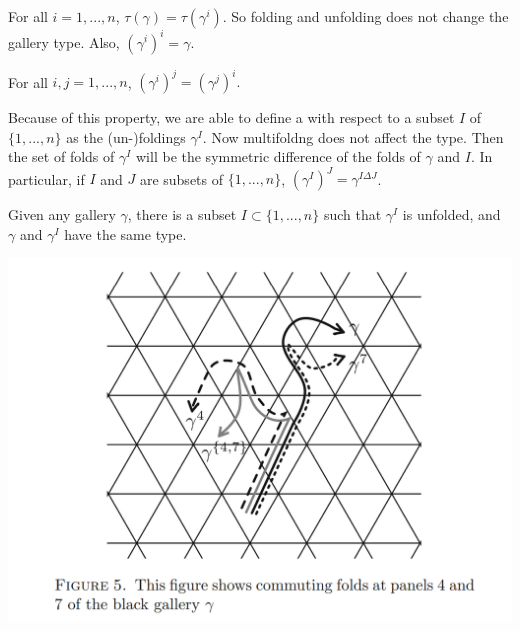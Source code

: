 \documentclass[12pt]{article}
\begin{document}
\begin{lemma}
    For all $i=1,...,n$, $\tau(\gamma)=\tau(\gamma^i)$. So folding and unfolding does not change the gallery type. Also, $(\gamma^i)^i=\gamma$.
\end{lemma}

\begin{lemma}
    For all $i,j=1,...,n$, $(\gamma^i)^j=(\gamma^j)^i.$
\end{lemma}

Because of this property, we are able to define a  with respect to a subset $I$ of $\{1,...,n\}$ as the (un-)foldings $\gamma^I$. Now multifoldng does not affect the type. Then the set of folds of $\gamma^I$ will be the symmetric difference of the folds of $\gamma$ and $I$. In particular, if $I$ and $J$ are subsets of $\{1,...,n\}$, $(\gamma^I)^J=\gamma^{I\Delta J}$. 

\begin{corollary}
    Given any gallery $\gamma$, there is a subset $I\subset \{1,...,n\}$ such that $\gamma^I$ is unfolded, and $\gamma$ and $\gamma^I$ have the same type.
\end{corollary}


\includegraphics[scale=0.6]{Screenshot 2023-02-03 153412.png}\\
\end{document}
